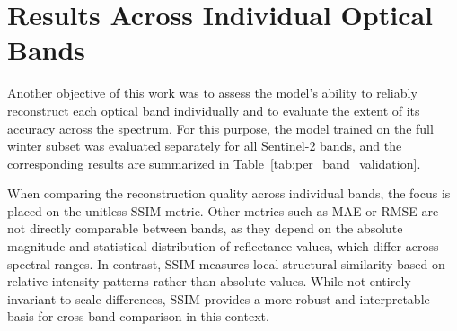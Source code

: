 \section{Results Across Individual Optical Bands}
Another objective of this work was to assess the model’s ability to reliably reconstruct each optical band individually and to evaluate the extent of its accuracy across the spectrum. 
For this purpose, the model trained on the full winter subset was evaluated separately for all Sentinel-2 bands, and the corresponding results are summarized in Table~\ref{tab:per_band_validation}.

When comparing the reconstruction quality across individual bands, the focus is placed on the unitless SSIM metric. Other metrics such as MAE or RMSE are not directly comparable between bands, as they depend on the absolute magnitude and statistical distribution of reflectance values, which differ across spectral ranges. In contrast, SSIM measures local structural similarity based on relative intensity patterns rather than absolute values. While not entirely invariant to scale differences, SSIM provides a more robust and interpretable basis for cross-band comparison in this context.
